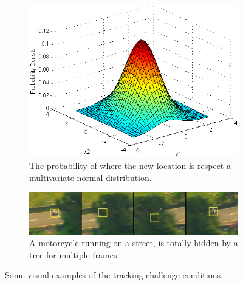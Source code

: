 \begin{figure}[!h]
\begin{subfigure}[!h]{0.49\textwidth}
		\label{fig:challenge_proximity}
	\end{subfigure}
	\begin{subfigure}[!h]{0.49\textwidth}
		\includegraphics[width=\linewidth]{images/tracking/challenge_multivariate}
		\caption{The probability of where the new location is respect a multivariate normal distribution.}
		\label{fig:challenge_multivariate}
	\end{subfigure}
	\begin{subfigure}[!h]{1\textwidth}
		\includegraphics[width=\linewidth]{images/tracking/challenge_totalOcclusion}
		\caption{A motorcycle running on a street, is totally hidden by a tree for multiple frames.}
		\label{fig:challenge_totalOcclusion}
	\end{subfigure}
	\caption{Some visual examples of the tracking challenge conditions.}
	\label{fig:trackingChallenges}
\end{figure}



